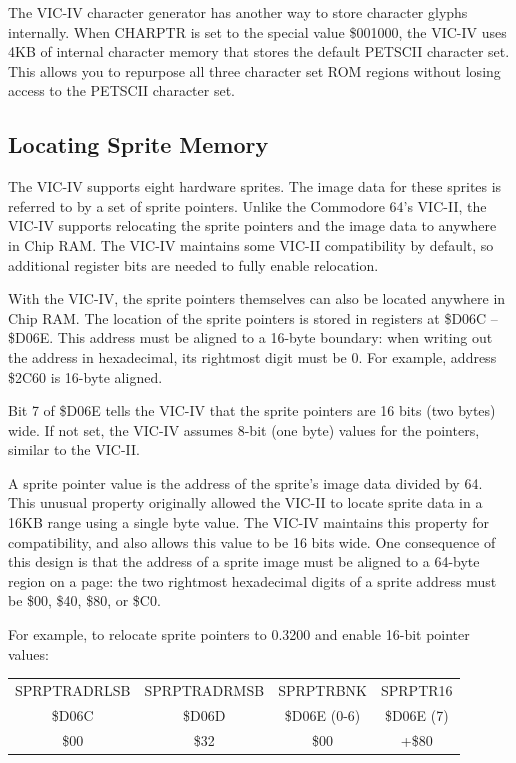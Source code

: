 The VIC-IV character generator has another way to store character glyphs internally. When CHARPTR is set to the special value \$001000, the VIC-IV uses 4KB of internal character memory that stores the default PETSCII character set. This allows you to repurpose all three character set ROM regions without losing access to the PETSCII character set.

\subsection{Locating Sprite Memory}

The VIC-IV supports eight hardware sprites. The image data for these sprites is referred to by a set of sprite pointers. Unlike the Commodore 64's VIC-II, the VIC-IV supports relocating the sprite pointers and the image data to anywhere in Chip RAM. The VIC-IV maintains some VIC-II compatibility by default, so additional register bits are needed to fully enable relocation.

With the VIC-IV, the sprite pointers themselves can also be located anywhere in Chip RAM. The location of the sprite pointers is stored in registers at \$D06C -- \$D06E. This address must be aligned to a 16-byte boundary: when writing out the address in hexadecimal, its rightmost digit must be 0. For example, address \$2C60 is 16-byte aligned.

Bit 7 of \$D06E tells the VIC-IV that the sprite pointers are 16 bits (two bytes) wide. If not set, the VIC-IV assumes 8-bit (one byte) values for the pointers, similar to the VIC-II.

A sprite pointer value is the address of the sprite's image data divided by 64. This unusual property originally allowed the VIC-II to locate sprite data in a 16KB range using a single byte value. The VIC-IV maintains this property for compatibility, and also allows this value to be 16 bits wide. One consequence of this design is that the address of a sprite image must be aligned to a 64-byte region on a page: the two rightmost hexadecimal digits of a sprite address must be \$00, \$40, \$80, or \$C0.

For example, to relocate sprite pointers to 0.3200 and enable 16-bit pointer values:

\begin{center}
\begin{tabular}{|c|c|c|c|}
\hline
SPRPTRADRLSB & SPRPTRADRMSB & SPRPTRBNK & SPRPTR16 \\
\$D06C & \$D06D & \$D06E (0-6) & \$D06E (7) \\
\hline
\$00 & \$32 & \$00 & +\$80 \\
\hline
\end{tabular}
\end{center}

